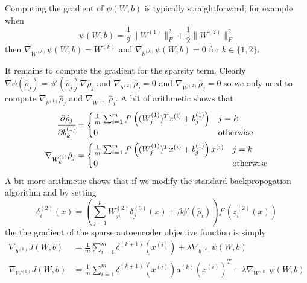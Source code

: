 \documentclass[twocolumn]{article}
\newcommand{\Wo}{W^{(1)}}
\newcommand{\Wt}{W^{(2)}}
\newcommand{\bo}{b^{(1)}}
\newcommand{\bt}{b^{(2)}}
\newcommand{\zt}{z^{(2)}}
\newcommand{\dr}{\delta^{(3)}}
\newcommand{\dt}{\delta^{(2)}}
\newcommand{\xii}{x^{(i)}}
\newcommand{\pd}[2]{\ensuremath{\cfrac{\partial #1}{\partial #2}}}
\begin{document}
Computing the gradient of $\psi(W,b)$ is typically straightforward; for example when
\[\psi(W,b)=\frac12\|\Wo\|_F^2+\frac12\|\Wt\|_F^2\] then $\nabla_{W^{(k)}}\psi(W,b)=W^{(k)}$ and
$\nabla_{b^{(k)}}\psi(W,b)=0$ for $k\in\{1,2\}$.

It remains to compute the gradient for the sparsity term.
Clearly $\nabla\phi(\hat\rho_j)=\phi'(\hat\rho_j)\nabla\hat\rho_j$ and $\nabla_{\bt}\hat\rho_j=0$ and
$\nabla_{\Wt}\hat\rho_j=0$ so we only need to compute $\nabla_{\bo}\hat\rho_j$ and $\nabla_{\Wo}\hat\rho_j$.
A bit of arithmetic shows that
\begin{align*}
  \pd{\hat\rho_j}{\bo_k} &= \begin{cases} 
      \frac1m\sum_{i=1}^mf'\left((\Wo_j)^T\xii+\bo_j\right) & j=k \\
      0 & \textrm{otherwise}
  \end{cases} \\
    \nabla_{\Wo_k}\hat\rho_j &= \begin{cases}
      \frac1m\sum_{i=1}^mf'\left((\Wo_j)^T\xii+\bo_j\right)\xii & j=k \\
      0 & \textrm{otherwise}
    \end{cases}
\end{align*}
A bit more arithmetic shows that if we modify the standard backpropogation algorithm and by setting
\[\dt_i(x) = \left(\sum_{j=1}^p\Wt_{ji}\dr_j(x)+\beta\phi'(\hat\rho_i)\right)f'\left(\zt_i(x)\right)\]
the the gradient of the sparse autoencoder objective function is simply
\begin{align*}
  \nabla_{b^{(k)}}J(W,b) &= \frac1m\sum_{i=1}^m\delta^{(k+1)}(\xii) + \lambda\nabla_{b^{(k)}}\psi(W,b) \\
  \nabla_{W^{(k)}}J(W,b) &= \frac1m\sum_{i=1}^m\delta^{(k+1)}(\xii)a^{(k)}(\xii)^T
    + \lambda\nabla_{W^{(k)}}\psi(W,b)
\end{align*}



\end{document}
